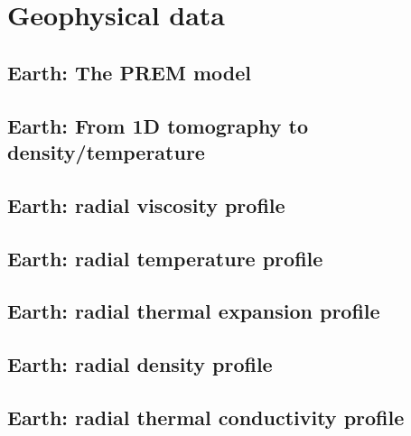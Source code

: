 \chapter{Geophysical data} 

\newpage %
\section{Earth: The PREM model} \label{ss:prem}  %
\newpage %
\section{Earth: From 1D tomography to density/temperature}  %
\newpage %
\section{Earth: radial viscosity profile \label{ss:viscprof}}  %
\newpage %
\section{Earth: radial temperature profile \label{ss:adiab}}  %
\newpage %
\section{Earth: radial thermal expansion profile}  %
\newpage %
\section{Earth: radial density profile}  %
\newpage %
\section{Earth: radial thermal conductivity profile}  %

